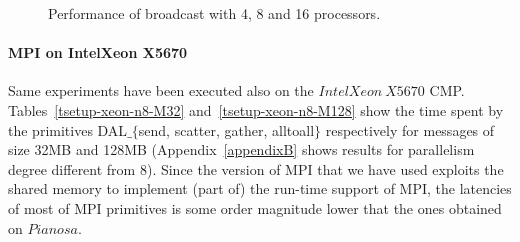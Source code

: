 \begin{figure}[h]
	\caption{Performance of broadcast with 4, 8 and 16 processors.}
	\label{pianosa-mpi-3}
\end{figure}

\clearpage

\paragraph{MPI on IntelXeon X5670}
Same experiments have been executed also on the $IntelXeon\ X5670$ CMP. Tables~\ref{tsetup-xeon-n8-M32} and~\ref{tsetup-xeon-n8-M128} show the time spent by the primitives DAL$\_\lbrace$send, scatter, gather, alltoall$\rbrace$ respectively for messages of size 32MB and 128MB (Appendix~\ref{appendixB} shows results for parallelism degree different from 8). Since the version of MPI that we have used exploits the shared memory to implement (part of) the run-time support of MPI, the latencies of most of MPI primitives is some order magnitude lower that the ones obtained on $Pianosa$.

